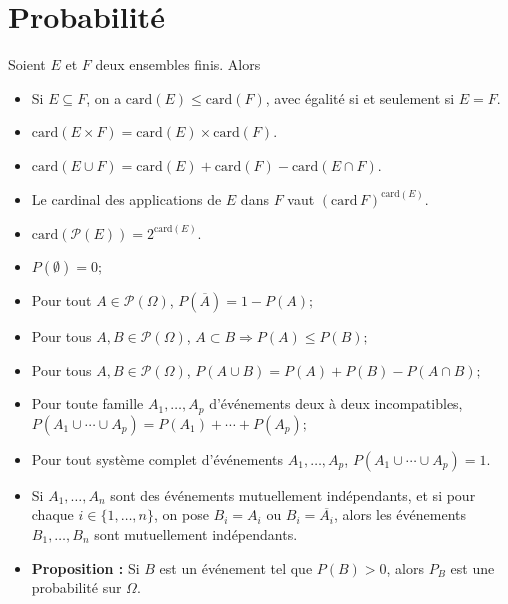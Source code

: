 \documentclass{article}
\begin{document}
\section{Probabilité}
	
Soient \( E \) et \( F \) deux ensembles finis. Alors

\begin{itemize}
	\item Si \( E \subseteq F \), on a \( \text{card}(E) \leq \text{card}(F) \), avec égalité si et seulement si \( E = F \).
	\item \( \text{card}(E \times F) = \text{card}(E) \times \text{card}(F) \).
	\item \( \text{card}(E \cup F) = \text{card}(E) + \text{card}(F) - \text{card}(E \cap F) \).
	\item Le cardinal des applications de \( E \) dans \( F \) vaut \( (\text{card} \, F)^{\text{card}(E)} \).
	\item \( \text{card}(\mathcal{P}(E)) = 2^{\text{card}(E)} \).
	\item $P(\emptyset) = 0;$
	\item Pour tout $A \in \mathcal{P}(\Omega)$, $P(\overline{A}) = 1 - P(A);$
	\item Pour tous $A, B \in \mathcal{P}(\Omega)$, $A \subset B \Rightarrow P(A) \leq P(B);$
 	\item Pour tous $A, B \in \mathcal{P}(\Omega)$, $P(A \cup B) = P(A) + P(B) - P(A \cap B);$
	\item Pour toute famille $A_1, \ldots, A_p$ d'événements deux à deux incompatibles, $P(A_1 \cup \cdots \cup A_p) = P(A_1) + \cdots + P(A_p);$
	\item Pour tout système complet d'événements $A_1, \ldots, A_p$, $P(A_1 \cup \cdots \cup A_p) = 1.$
	\item Si \( A_1, \ldots, A_n \) sont des événements mutuellement indépendants, et si pour chaque \( i \in \{1, \ldots, n\} \), on pose \( B_i = A_i \) ou \( B_i = \overline{A_i} \), alors les événements \( B_1, \ldots, B_n \) sont mutuellement indépendants.
	\item \textbf{Proposition :} Si \( B \) est un événement tel que \( P(B) > 0 \), alors \( P_B \) est une probabilité sur \( \Omega \).


\end{itemize}
\end{document}
